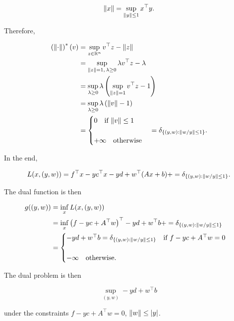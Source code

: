 \begin{example}
    \[ \lVert x \rVert = \sup_{\lVert y \rVert \le 1} x^\top y. \]

    Therefore,

    \begin{align*}
        \left(\lVert \cdot \rVert\right)^*(v) &= \sup_{z \in {\mathbb{R}^n}} v^\top z - \lVert z \rVert \\
        &= \sup_{\lVert z \rVert = 1, \, \lambda \ge 0} \lambda v^\top z - \lambda \\
        &= \sup_{\lambda \ge 0} \lambda \left(\sup_{\lVert z \rVert = 1} v^\top z - 1\right) \\
        &= \sup_{\lambda \ge 0} \lambda \left(\lVert v \rVert - 1\right) \\ 
        &= \begin{cases}
            0 \quad \text{if } \lVert v \rVert \le 1 \\
            \\
            +\infty \quad\text{otherwise}
        \end{cases} = \delta_{\left\{ (y,w) : \lVert w/y \rVert \le 1 \right\}}.
    \end{align*}

    In the end, 
    
    \[ L(x,(y,w)) = f^\top x - yc^\top x - yd + w^\top (Ax + b) + = \delta_{\left\{ (y,w) : \lVert w/y \rVert \le 1 \right\}}.\]

    The dual function is then 

    \begin{align*}
        g((y,w)) &= \inf_x L(x,(y,w)) \\
            &= \inf_x \left(f - yc + A^\top w \right)^\top - yd + w^\top b + = \delta_{\left\{ (y,w) : \lVert w/y \rVert \le 1 \right\}} \\
            &= \begin{cases}
                -yd + w^\top b = \delta_{\left\{ (y,w) : \lVert w/y \rVert \le 1 \right\}} \quad \text{if } f - yc + A^\top w = 0 \\
                \\
                -\infty \quad\text{otherwise}.
            \end{cases}
    \end{align*}

    The dual problem is then 

    \[ \sup_{(y,w)} - yd + w^\top b \]

    under the constraints $f - yc + A^\top w = 0$, $\lVert w \rVert \le \left|y\right|$.
    
\end{example}